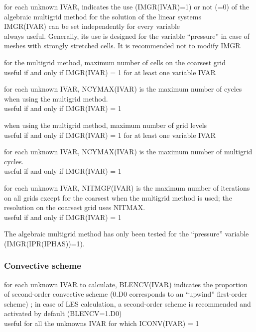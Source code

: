 {for each unknown IVAR, indicates the use (IMGR(IVAR)=1) or not (=0) of the
algebraic multigrid method for the solution of the linear systems\\
IMGR(IVAR) can be set independently for every variable\\
always useful. Generally, its use is designed for the variable ``pressure'' in
case of meshes with strongly stretched cells. It is recommended not to modify
IMGR}

{for the multigrid method, maximum number of cells on the coarsest grid\\
useful if and only if IMGR(IVAR) = 1 for at least one variable IVAR}

{for each unknown IVAR, NCYMAX(IVAR) is the maximum number of cycles when using
the multigrid method.\\
useful if and only if IMGR(IVAR) = 1}

{when using the multigrid method, maximum number of grid levels\\
useful if and only if IMGR(IVAR) = 1 for at least one variable IVAR}

{for each unknown IVAR, NCYMAX(IVAR) is the maximum number of multigrid cycles.\\
useful if and only if IMGR(IVAR) = 1}

{for each unknown IVAR, NITMGF(IVAR) is the maximum number of iterations on
all grids except for the coarsest when the multigrid method is used;
the resolution on the coarsest grid uses NITMAX.\\
useful if and only if IMGR(IVAR) = 1}

The algebraic multigrid method has only been tested for
the ``pressure'' variable (IMGR(IPR(IPHAS))=1).

\subsubsection{Convective scheme}

{for each unknown IVAR to calculate, BLENCV(IVAR) indicates the proportion of
second-order convective scheme (0.D0 corresponds to an
``upwind'' first-order scheme) ; in case of LES calculation, a
second-order scheme is recommended and activated by default (BLENCV=1.D0)\\
useful for all the unknowns IVAR for which ICONV(IVAR) = 1}

